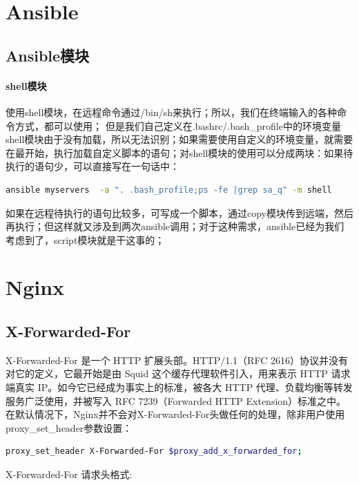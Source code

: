 \documentclass[letter]{book}
\begin{document}
\section{Ansible}

\subsection{Ansible模块}

\paragraph{shell模块}使用shell模块，在远程命令通过/bin/sh来执行；所以，我们在终端输入的各种命令方式，都可以使用； 但是我们自己定义在.bashrc/.bash\_profile中的环境变量shell模块由于没有加载，所以无法识别；如果需要使用自定义的环境变量，就需要在最开始，执行加载自定义脚本的语句；对shell模块的使用可以分成两块：如果待执行的语句少，可以直接写在一句话中：

\begin{lstlisting}[language=bash]
ansible myservers  -a ". .bash_profile;ps -fe |grep sa_q" -m shell
\end{lstlisting}

如果在远程待执行的语句比较多，可写成一个脚本，通过copy模块传到远端，然后再执行；但这样就又涉及到两次ansible调用；对于这种需求，ansible已经为我们考虑到了，script模块就是干这事的；


\section{Nginx}

\subsection{X-Forwarded-For}

X-Forwarded-For 是一个 HTTP 扩展头部。HTTP/1.1（RFC 2616）协议并没有对它的定义，它最开始是由 Squid 这个缓存代理软件引入，用来表示 HTTP 请求端真实 IP。如今它已经成为事实上的标准，被各大 HTTP 代理、负载均衡等转发服务广泛使用，并被写入 RFC 7239（Forwarded HTTP Extension）标准之中。在默认情况下，Nginx并不会对X-Forwarded-For头做任何的处理，除非用户使用proxy\_set\_header参数设置：

\begin{lstlisting}[language=bash]
proxy_set_header X-Forwarded-For $proxy_add_x_forwarded_for;
\end{lstlisting}

X-Forwarded-For 请求头格式:
\end{document}
